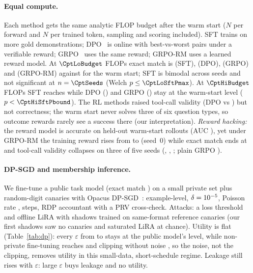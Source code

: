 \paragraph{Equal compute.} Each method gets the same analytic FLOP budget after the warm start
($N$ per forward and $N$ per trained token, sampling and scoring included). SFT trains on more
gold demonstrations; DPO~\citep{dpo} is online with best-vs-worst pairs under a verifiable reward;
GRPO~\citep{deepseekmath} uses the same reward; GRPO-RM uses a learned reward model. At $\CptLoBudget$
FLOPs exact match is \CptLoSftEm{} (SFT), \CptLoDpoEm{} (DPO), \CptLoGrpoEm{} (GRPO) and \CptLoGrpoRmEm{}
(GRPO-RM) against \CptLoWarmEm{} for the warm start; SFT is bimodal across seeds and not significant at
$n=\CptSeeds$ (Welch $p\le\CptLoSftPmax$). At $\CptHiBudget$ FLOPs SFT reaches \CptHiSftEm{} while DPO
(\CptHiDpoEm) and GRPO (\CptHiGrpoEm) stay at the warm-start level ($p<\CptHiSftPbound$). The RL methods
raised tool-call validity (DPO \CptLoDpoTool{} vs \CptLoWarmTool) but not correctness; the warm start never
solves three of six question types, so outcome rewards rarely see a success there (our interpretation). \emph{Reward hacking:} the reward model is accurate on held-out warm-start rollouts (AUC
\CptRmAuc), yet under GRPO-RM the training reward rises from \CptRmRewFirstA{} to \CptRmRewLastA{} (seed~0)
while exact match ends at \CptHiGrpoRmEm{} and tool-call validity collapses on three of five seeds
(\CptRmToolA, \CptRmToolC, \CptRmToolE; plain GRPO \CptHiGrpoTool).

\paragraph{DP-SGD and membership inference.} We fine-tune a public task model (exact match \CdpBaseEm) on
a small private set plus random-digit canaries with Opacus DP-SGD~\citep{dpsgd,opacus}: example-level,
$\delta=10^{-5}$, Poisson rate \CdpRate, \CdpSteps{} steps, RDP accountant with a PRV
cross-check. Attacks: a loss threshold~\citep{shokri} and offline LiRA with shadows trained on
same-format reference canaries (our first shadows saw no canaries and saturated LiRA at chance). Utility
is flat (Table~\ref{tab:dp}): every $\varepsilon$ from \CdpOneRdp{} to \CdpTenTwentyFourRdp{} stays at the
public model's level, while non-private fine-tuning reaches \CdpNoneEm{} and clipping without noise
\CdpClipEm, so the noise, not the clipping, removes utility in this small-data, short-schedule regime.
Leakage still rises with $\varepsilon$: large $\varepsilon$ buys leakage and no utility.

